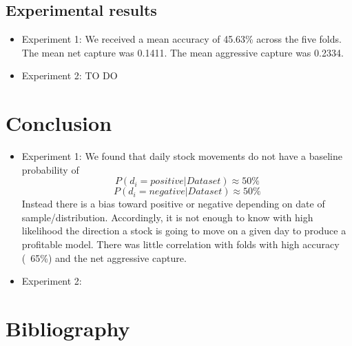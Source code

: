 \documentclass[11pt,letterpaper]{article}
\newcommand{\blue}[1]{\textcolor{RoyalBlue}{#1}}
\newcommand{\instructions}[1]{\blue{\textit{#1}}}
\begin{document}
\subsection{Experimental results}
\label{sec:experimental-results}
\begin{itemize}
\item Experiment 1: We received a mean accuracy of 45.63\% across the five folds.
  The mean net capture was 0.1411. The mean aggressive capture was 0.2334.
\item Experiment 2: TO DO
\end{itemize}

\section{Conclusion}
\begin{itemize}
\item Experiment 1: We found that daily stock movements do not have a
  baseline probability of
\[
  	P(\text{\(d_i = positive\)} | \text{\(Dataset\)}) \approx 50\%
\]
\[
  	P(\text{\(d_i = negative\)} | \text{\(Dataset\)}) \approx 50\%
\]
  Instead there is a bias toward positive or negative depending on date of sample/distribution.
  Accordingly, it is not enough to know with high likelihood the direction a
  stock is going to move on a given day to produce a profitable model. There
  was little correlation with folds with high accuracy (~65\%) and the
  net aggressive capture.
\item Experiment 2:
\end{itemize}


\section*{Bibliography}
{}

\end{document}
